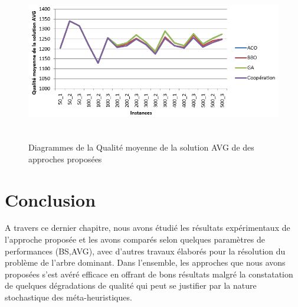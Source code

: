 \begin{figure}[H]
	\centering
	\includegraphics[width=16cm,height=7cm]{Chap5/6.png}
	\caption{Diagrammes de la Qualité moyenne de la solution AVG de des approches proposées}
	\label{fig:DQMSAP}
\end{figure}



\section{Conclusion}
A travers ce dernier chapitre, nous avons étudié les résultats expérimentaux de l’approche proposée et les avons comparés selon quelques paramètres de performances (BS,AVG), avec d’autres travaux élaborés pour la résolution du problème de l’arbre dominant. Dans l’ensemble, les approches que nous avons proposées s’est avéré efficace en offrant de bons résultats malgré la constatation de quelques dégradations de qualité qui peut se justifier par la nature stochastique des méta-heuristiques.


